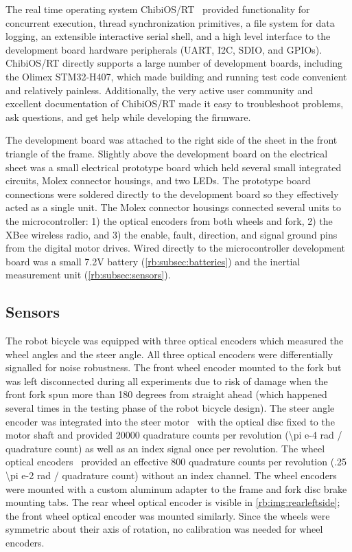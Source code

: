 The real time operating system ChibiOS/RT~\cite{ChibiOS} provided functionality
for concurrent execution, thread synchronization primitives, a file system for
data logging, an extensible interactive serial shell, and a high level
interface to the development board hardware peripherals (UART, I2C, SDIO, and
GPIOs). ChibiOS/RT directly supports a large number of development boards,
including the Olimex STM32-H407, which made building and running test code
convenient and relatively painless.  Additionally, the very active user
community and excellent documentation of ChibiOS/RT made it easy to
troubleshoot problems, ask questions, and get help while developing the
firmware.

The development board was attached to the right side of the sheet in the front
triangle of the frame. Slightly above the development board on the electrical
sheet was a small electrical prototype board which held several small
integrated circuits, Molex connector housings, and two LEDs. The prototype
board connections were soldered directly to the development board so they
effectively acted as a single unit. The Molex connector housings connected
several units to the microcontroller: 1) the optical encoders from both wheels
and fork, 2) the XBee wireless radio, and 3) the enable, fault, direction, and
signal ground pins from the digital motor drives. Wired directly to the
microcontroller development board was a small 7.2V battery
(\autoref{rb:subsec:batteries}) and the inertial measurement unit
(\autoref{rb:subsec:sensors}).

\subsection{Sensors} \label{rb:subsec:sensors}
The robot bicycle was equipped with three optical encoders which measured the
wheel angles and the steer angle. All three optical encoders were
differentially signalled for noise robustness. The front wheel encoder mounted
to the fork but was left disconnected during all experiments due to risk of
damage when the front fork spun more than 180 degrees from straight ahead
(which happened several times in the testing phase of the robot bicycle
design). The steer angle encoder was integrated into the steer
motor~\cite{TeknicM3441} with the optical disc fixed to the motor shaft and
provided 20000 quadrature counts per revolution (\num{\pi e-4} rad / quadrature
count) as well as an index signal once per revolution. The wheel optical
encoders~\cite{USDigitalH5} provided an effective 800 quadrature counts per
revolution (\num{.25 \pi e-2} rad / quadrature count) without an index channel. The
wheel encoders were mounted with a custom aluminum adapter to the frame and
fork disc brake mounting tabs. The rear wheel optical encoder is visible in
\autoref{rb:img:rearleftside}; the front wheel optical encoder was mounted
similarly. Since the wheels were symmetric about their axis of rotation, no
calibration was needed for wheel encoders.

